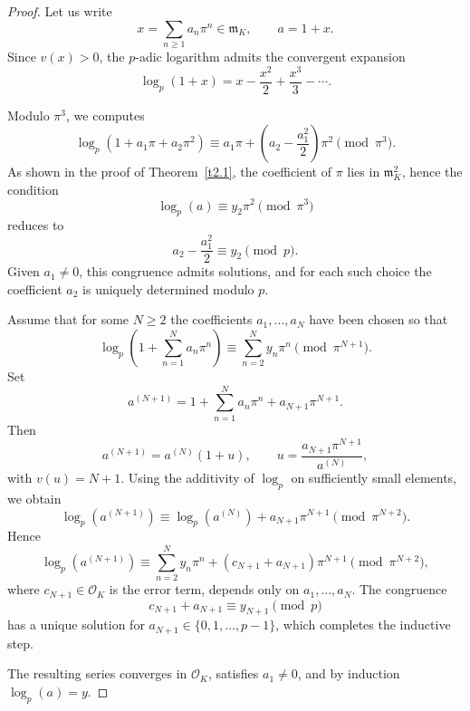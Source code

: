 \documentclass[12pt,reqno]{amsart}
\numberwithin{figure}{section}
\theoremstyle{plain}
\theoremstyle{definition}
\numberwithin{equation}{section}
\begin{document}
\begin{proof}
Let us write
\[
x=\sum_{n\ge 1} a_n \pi^n \in \mathfrak m_K ,
\qquad a=1+x .
\]
Since $v(x)>0$, the $p$-adic logarithm admits the convergent expansion
\[
\log_p(1+x)=x-\frac{x^2}{2}+\frac{x^3}{3}-\cdots .
\]


Modulo $\pi^3$, we computes
\[
\log_p(1+a_1\pi+a_2\pi^2)
\equiv a_1\pi+\left(a_2-\frac{a_1^2}{2}\right)\pi^2
\pmod{\pi^3}.
\]
As shown in the proof of Theorem~\ref{t2.1}, the coefficient of $\pi$ lies in
$\mathfrak m_K^2$, hence the condition
\[
\log_p(a)\equiv y_2\pi^2 \pmod{\pi^3}
\]
reduces to
\[
a_2-\frac{a_1^2}{2}\equiv y_2 \pmod{p}.
\]
Given $a_1 \neq 0$, this congruence admits solutions, and for each such choice the
coefficient $a_2$ is uniquely determined modulo $p$.

Assume that for some $N\ge 2$ the coefficients
$a_1,\dots,a_N$ have been chosen so that
\[
\log_p\!\left(1+\sum_{n=1}^N a_n\pi^n\right)
\equiv \sum_{n=2}^N y_n\pi^n
\pmod{\pi^{N+1}}.
\]
Set
\[
a^{(N+1)}=1+\sum_{n=1}^N a_n\pi^n+a_{N+1}\pi^{N+1}.
\]
Then
\[
a^{(N+1)}=a^{(N)}\left(1+u\right),
\qquad
u=\frac{a_{N+1}\pi^{N+1}}{a^{(N)}},
\]
with $v(u)=N+1$. Using the additivity of $\log_p$ on sufficiently small elements,
we obtain
\[
\log_p(a^{(N+1)})
\equiv \log_p(a^{(N)}) + a_{N+1}\pi^{N+1}
\pmod{\pi^{N+2}}.
\]
Hence
\[
\log_p(a^{(N+1)})
\equiv \sum_{n=2}^N y_n\pi^n
+ \left(c_{N+1}+a_{N+1}\right)\pi^{N+1}
\pmod{\pi^{N+2}},
\]
where $c_{N+1}\in\mathcal O_K$ is the error term, depends only on $a_1,\dots,a_N$.
The congruence
\[
c_{N+1}+a_{N+1}\equiv y_{N+1}\pmod{p}
\]
has a unique solution for $a_{N+1}\in\{0,1,\dots,p-1\}$, which completes the
inductive step.


The resulting series converges in $\mathcal O_K$, satisfies $a_1\neq 0$, and by induction $\log_p(a)=y$.
\end{proof}
\end{document}
